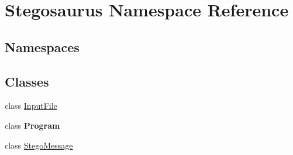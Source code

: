 \hypertarget{namespace_stegosaurus}{}\section{Stegosaurus Namespace Reference}
\label{namespace_stegosaurus}
\subsection*{Namespaces}
\begin{DoxyCompactItemize}
\end{DoxyCompactItemize}
\subsection*{Classes}
\begin{DoxyCompactItemize}
\item 
class \hyperlink{class_stegosaurus_1_1_input_file}{Input\+File}
\item 
class {\bfseries Program}
\item 
class \hyperlink{class_stegosaurus_1_1_stego_message}{Stego\+Message}
\end{DoxyCompactItemize}
